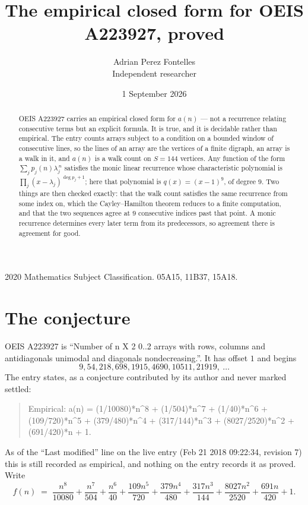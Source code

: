 \documentclass[11pt,a4paper]{article}
\title{The empirical closed form for OEIS A223927, proved}
\author{Adrian Perez Fontelles\\ \small Independent researcher}
\date{1 September 2026}
\theoremstyle{plain}
\theoremstyle{definition}
\begin{document}
\maketitle

\begin{abstract}
OEIS A223927 carries an empirical closed form for $a(n)$ --- not a recurrence relating
consecutive terms but an explicit formula. It is true, and it is decidable rather than
empirical. The entry counts arrays subject to a condition on a bounded window of consecutive lines, so the lines of an array are the
vertices of a finite digraph, an array is a walk in it, and $a(n)$ is a walk count on
$S=144$ vertices. Any function of the form $\sum_j p_j(n)\lambda_j^{\,n}$ satisfies the
monic linear recurrence whose characteristic polynomial is
$\prod_j(x-\lambda_j)^{\deg p_j+1}$; here that polynomial is $q(x)=(x-1)^{9}$, of degree
$9$. Two things are then checked exactly: that the walk count satisfies the same
recurrence from some index on, which the Cayley--Hamilton theorem reduces to a finite
computation, and that the two sequences agree at $9$ consecutive indices past that
point. A monic recurrence determines every later term from its predecessors, so agreement
there is agreement for good.
\end{abstract}

\noindent\small 2020 Mathematics Subject Classification. 05A15, 11B37, 15A18.\normalsize

\section{The conjecture}

OEIS A223927 is ``Number of n X 2 0..2 arrays with rows, columns and antidiagonals unimodal and diagonals nondecreasing.''. It has offset $1$ and begins
\[
9, 54, 218, 698, 1915, 4690, 10511, 21919,\ \dots
\]
The entry states, as a conjecture contributed by its author and never marked settled:
\begin{quote}
Empirical: a(n) = (1/10080)*n\^{}8 + (1/504)*n\^{}7 + (1/40)*n\^{}6 + (109/720)*n\^{}5 + (379/480)*n\^{}4 + (317/144)*n\^{}3 + (8027/2520)*n\^{}2 + (691/420)*n + 1.
\end{quote}
As of the ``Last modified'' line on the live entry (Feb 21 2018 09:22:34, revision 7) this is still
recorded as empirical, and nothing on the entry records it as proved. Write
\[
f(n)\;=\;\frac{n^{8}}{10080} + \frac{n^{7}}{504} + \frac{n^{6}}{40} + \frac{109 n^{5}}{720} + \frac{379 n^{4}}{480} + \frac{317 n^{3}}{144} + \frac{8027 n^{2}}{2520} + \frac{691 n}{420} + 1.
\]
\end{document}
